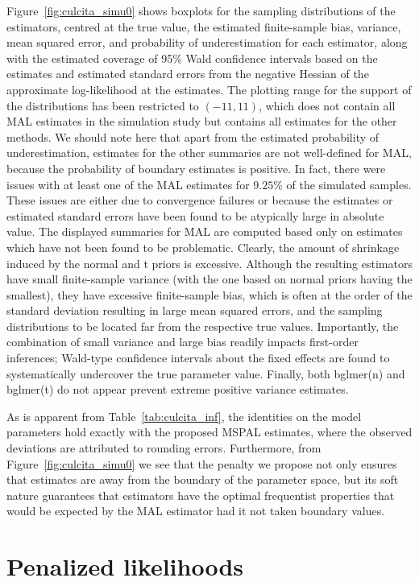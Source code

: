 \documentclass[11pt, a4paper]{article}
\theoremstyle{example} \newtheorem{example}{Example}[section]
\theoremstyle{theorem} \newtheorem{theorem}{Theorem}[section]
\begin{document}
Figure~\ref{fig:culcita_simu0} shows boxplots for the sampling
distributions of the estimators, centred at the true value, the estimated
finite-sample bias, variance, mean squared error, and probability of
underestimation for each estimator, along with the estimated coverage
of 95\% Wald confidence intervals based on the estimates and estimated
standard errors from the negative Hessian of the approximate
log-likelihood at the estimates. The plotting range for the support of
the distributions has been restricted to $(-11, 11)$, which does not
contain all MAL estimates in the simulation study but contains all
estimates for the other methods. We should note here that apart from
the estimated probability of underestimation,
estimates for the other summaries are not well-defined for MAL,
because the probability of boundary estimates is positive. In fact,
there were issues with at least one of the MAL estimates for $9.25\%$
of the simulated samples. These issues are either due to convergence
failures or because the estimates or estimated standard errors have
been found to be atypically large in absolute value. The displayed
summaries for MAL are computed based only on estimates which have not
been found to be problematic. Clearly, the amount of shrinkage induced
by the normal and t priors is excessive. Although the resulting
estimators have small finite-sample variance (with the one based on
normal priors having the smallest), they have excessive finite-sample
bias, which is often at the order of the standard deviation resulting
in large mean squared errors, and the sampling distributions to be
located far from the respective true values. Importantly, the
combination of small variance and large bias readily impacts
first-order inferences; Wald-type confidence intervals about the fixed
effects are found to systematically undercover the true parameter
value. Finally, both bglmer(n) and bglmer(t) do not appear prevent extreme positive variance estimates.

As is apparent from Table~\ref{tab:culcita_inf}, the identities on the
model parameters hold exactly with the proposed MSPAL estimates, where the observed deviations are attributed to rounding errors. Furthermore, from
Figure~\ref{fig:culcita_simu0} we see that the penalty we propose not only ensures
that estimates are away from the boundary of the parameter space, but
its soft nature guarantees that estimators have the optimal
frequentist properties that would be expected by the MAL estimator
had it not taken boundary values. 


\section{Penalized likelihoods}
\label{sec:softpen}
\end{document}
